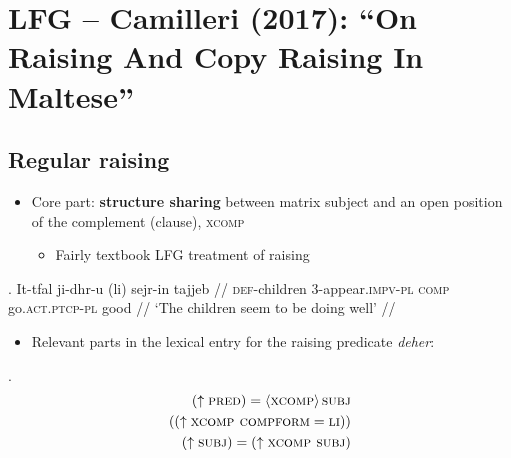 \documentclass[11pt]{article}
\begin{document}
\section{LFG – Camilleri (2017): ``On Raising And Copy Raising In Maltese''}
\label{sec:lfg}

\subsection{Regular raising}

\begin{itemize}
  \item Core part: \textbf{structure sharing} between matrix subject and an open position of the complement (clause), \textsc{xcomp} \begin{itemize}
      \item Fairly textbook LFG treatment of raising
    \end{itemize}
\end{itemize}

\ex. \begingl
\gla It-tfal ji-dhr-u (li) sejr-in tajjeb //
\glb \textsc{def}-children 3-appear.\textsc{impv-pl} \textsc{comp} go.\textsc{act.ptcp-pl} good //
\glft `The children seem to be doing well' //
\endgl

\begin{itemize}
  \item Relevant parts in the lexical entry for the raising predicate \emph{deher}:
\end{itemize}

\ex.  \begin{align*}
  (\uparrow \textsc{pred}) = \left\langle \textsc{xcomp} \right\rangle \textsc{subj} \\
  ((\uparrow \textsc{xcomp compform} = \textsc{li})) \\
  (\uparrow \textsc{subj}) = (\uparrow \textsc{xcomp subj}) \\
\end{align*}
\end{document}

